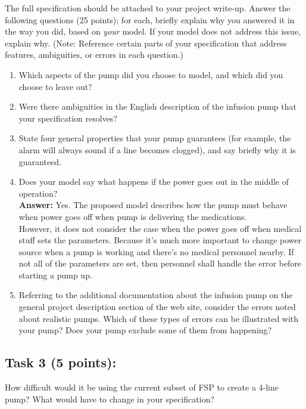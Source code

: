 \documentclass{article}
\newcommand{\head}{\subsection*}
\begin{document}
\noindent The full specification should be attached to your project
write-up. Answer the following questions (25 points); for each,
briefly explain why you answered it in the way you did, based on
\emph{your} model. If your model does not address this issue,
explain why. (Note: Reference certain parts of your specification that address features, ambiguities, or errors in each question.)

\begin{enumerate}
    \item Which aspects of the pump did you choose to model, and which did you choose to leave out?
    \item Were there ambiguities in the English description of the infusion pump that your specification resolves?
    \item State four general properties that your pump guarantees (for example, the alarm will always sound if a line becomes clogged), and say briefly why it is guaranteed.
    \item Does your model say what happens if the power goes out in the middle of operation? 
    \\
    \textbf{Answer:} Yes. The proposed model describes how the pump must behave when power goes off when pump is delivering the medications. 
    \\However, it does not consider the case when the power goes off when medical stuff sets the parameters. Because it's much more important to change power source when a pump is working and there's no medical personnel nearby. If not all of the parameters are set, then personnel shall handle the error before starting a pump up. 
    \item Referring to the additional documentation about the infusion pump on the general project description section of the web site, consider the errors noted about realistic pumps. Which of these types of errors can be illustrated with your pump? Does your pump exclude some of them from happening?

\end{enumerate}


\head{Task 3 (5 points):}


How difficult would it be using the current subset of FSP to create
a 4-line pump? What would have to change in your specification?
\end{document}
